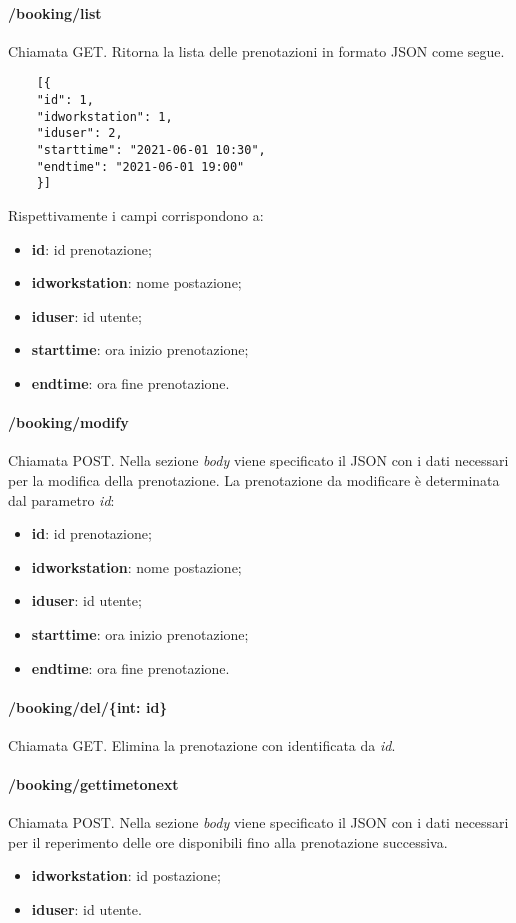 \paragraph{/booking/list}
Chiamata GET. Ritorna la lista delle prenotazioni in formato JSON come segue.	\\
\begin{center}
	\begin{lstlisting}
	[{
	"id": 1,
	"idworkstation": 1,
	"iduser": 2,
	"starttime": "2021-06-01 10:30",
	"endtime": "2021-06-01 19:00"
	}]
	\end{lstlisting}
\end{center}
Rispettivamente i campi corrispondono a:
\begin{itemize}
	\item \textbf{id}: id prenotazione;
	\item \textbf{idworkstation}: nome postazione;
	\item \textbf{iduser}: id utente;
	\item \textbf{starttime}: ora inizio prenotazione;
	\item \textbf{endtime}: ora fine prenotazione.	
\end{itemize}
\paragraph{/booking/modify}
Chiamata POST. Nella sezione \textit{body} viene specificato il JSON con i dati necessari per la modifica della prenotazione. La prenotazione da modificare è determinata dal parametro \textit{id}:
\begin{itemize}
	\item \textbf{id}: id prenotazione;
	\item \textbf{idworkstation}: nome postazione;
	\item \textbf{iduser}: id utente;
	\item \textbf{starttime}: ora inizio prenotazione;
	\item \textbf{endtime}: ora fine prenotazione.	
\end{itemize}
\paragraph{/booking/del/\{int: id\}}
Chiamata GET. Elimina la prenotazione con identificata da \textit{id}.
\paragraph{/booking/gettimetonext}
Chiamata POST. Nella sezione \textit{body} viene specificato il JSON con i dati necessari per il reperimento delle ore disponibili fino alla prenotazione successiva.
\begin{itemize}
	\item \textbf{idworkstation}: id postazione;
	\item \textbf{iduser}: id utente.
\end{itemize}
